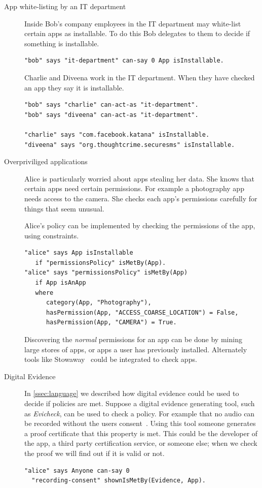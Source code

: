 \documentclass[a4paper]{scrartcl}
\begin{document}
\begin{description}
  \item[App white-listing by an IT department]
    Inside Bob's company employees in the IT department may white-list certain apps as installable.
    To do this Bob delegates to them to decide if something is installable.
    \begin{lstlisting}
"bob" says "it-department" can-say 0 App isInstallable.
    \end{lstlisting}
    Charlie and Diveena work in the IT department.
    When they have checked an app they say it is installable.
    \begin{lstlisting}
"bob" says "charlie" can-act-as "it-department".
"bob" says "diveena" can-act-as "it-department".

"charlie" says "com.facebook.katana" isInstallable.
"diveena" says "org.thoughtcrime.securesms" isInstallable.
    \end{lstlisting}

  \item[Overpriviliged applications]
    Alice is particularly worried about apps stealing her data.
    She knows that certain apps need certain permissions.
    For example a photography app needs access to the camera.
    She checks each app's permissions carefully for things that seem unusual.

    Alice's policy can be implemented by checking the permissions of the app, using constraints.
    \begin{lstlisting}
"alice" says App isInstallable
   if "permissionsPolicy" isMetBy(App).
"alice" says "permissionsPolicy" isMetBy(App)
   if App isAnApp
   where
      category(App, "Photography"),
      hasPermission(App, "ACCESS_COARSE_LOCATION") = False,
      hasPermission(App, "CAMERA") = True.
    \end{lstlisting}

    Discovering the \emph{normal} permissions for an app can be done by mining large stores of apps, or apps a user has previously installed.
    Alternately tools like Stowaway~\citep{Felt:2011kj} could be integrated to check apps.

  \item[Digital Evidence]
    In \autoref{ssec:language} we described how digital evidence could be used to decide if policies are met.
    Suppose a digital evidence generating tool, such as \emph{Evicheck}, can be used to check a policy.
    For example that no audio can be recorded without the users consent~\citep{Seghir:2014uq}.
    Using this tool someone generates a proof certificate that this property is met.
    This could be the developer of the app, a third party certification service, or someone else;
      when we check the proof we will find out if it is valid or not.
    \begin{lstlisting}
"alice" says Anyone can-say 0 
  "recording-consent" shownIsMetBy(Evidence, App).


\end{lstlisting}
\end{description}
\end{document}
